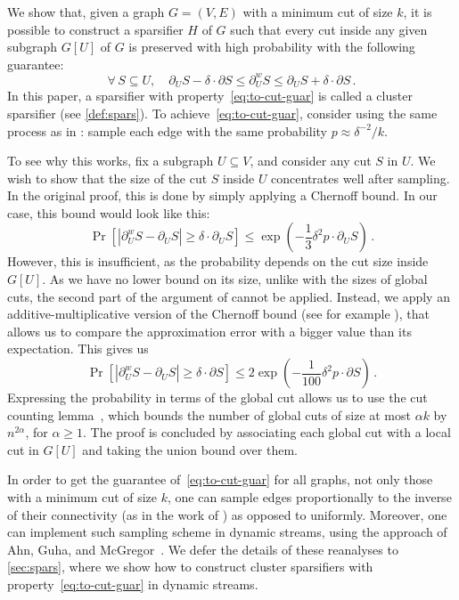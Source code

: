 \documentclass[epsfig,letter,11pt]{article}
\numberwithin{equation}{section}
\newcommand{\uncut}[2]{{\partial}_{#2} #1}
\newcommand{\uncutg}[1]{{\partial} #1}
\newcommand{\wcut}[2]{\partial^w_{#2} #1}
\begin{document}
We show that, given a graph $G=(V, E)$ with a minimum cut of size $k$, it is possible to construct a sparsifier $H$ of $G$ such that every cut inside any given subgraph $G[U]$ of $G$ is preserved with high probability with the following guarantee:
\begin{equation}
	\label{eq:to-cut-guar}
	\forall \, S \subseteq U, \quad \uncut{S}{U} - \delta \cdot \uncutg{S} \le \wcut{S}{U}  \le \uncut{S}{U} + \delta \cdot \uncutg{S}\,.
\end{equation}
In this paper, a sparsifier with property~\eqref{eq:to-cut-guar} is called a cluster sparsifier (see \cref{def:spars}).
To achieve~\eqref{eq:to-cut-guar}, consider using the same process as in \cite{karger1994random}: sample each edge with the same probability $p \approx {\delta^{-2}/ k}$.

To see why this works, fix a subgraph $U \subseteq V$, and consider any cut $S$ in $U$. 
We wish to show that the size of the cut $S$ inside $U$ concentrates well after sampling. In the original proof, this is done by simply applying a Chernoff bound. In our case, this bound would look like this:
\begin{equation*}
	\Pr[|\wcut{S}{U} - \uncut{S}{U}| \geq \delta \cdot \uncut{S}{U}] \leq \exp\left(-\frac{1}{3} \delta^2 p \cdot \uncut{S}{U} \right) \, .
\end{equation*}
\noindent
However, this is insufficient, as the probability depends on the cut size inside $G[U]$. As we have no lower bound on its size, unlike with the sizes of global cuts, the second part of the argument of \cite{karger1994random} cannot be applied. Instead, we apply an additive-multiplicative version of the Chernoff bound (see for example \cite{streamexpdec}), that allows us to compare the approximation error with a bigger value than its expectation. This gives us
\begin{equation*}
	\Pr[|\wcut{S}{U} - \uncut{S}{U}| \geq \delta \cdot \uncutg{S}] \leq 2\exp\left(-\frac{1}{100} \delta^2 p \cdot \uncutg{S} \right) \, .
\end{equation*}
Expressing the probability in terms of the global cut allows us to use the cut counting lemma~\cite{karger1993global}, which bounds the number of global cuts of size at most $\alpha k$ by $n^{2\alpha}$,  for $\alpha \geq 1$. The proof is concluded by associating each global cut with a local cut in $G[U]$ and taking the union bound over them.

In order to get the guarantee of~\eqref{eq:to-cut-guar} for all graphs, not only those with a minimum cut of size $k$, one can sample edges proportionally to the inverse of their connectivity (as in the work of \cite{fungspars}) as opposed to uniformly. Moreover, one can implement such sampling scheme in dynamic streams, using the approach of Ahn, Guha, and McGregor~\cite{sparsdynamicstreams}. We defer the details of these reanalyses to \cref{sec:spars}, where we show how to construct cluster sparsifiers with property~\eqref{eq:to-cut-guar} in dynamic streams.
\end{document}
